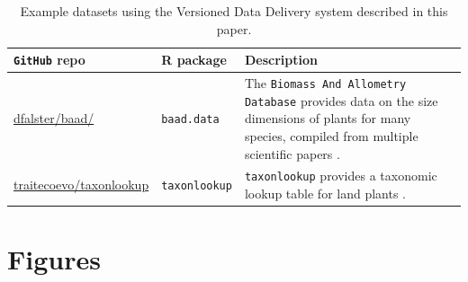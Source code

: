 \documentclass[a4paper,11pt]{article}
\newcommand{\ghsmurl}[1]{{\footnotesize\href{https://github.com/#1}{#1}}}
\begin{document}
\newpage

\begin{table}[h!]
\centering
\caption{Example datasets using the Versioned Data Delivery system described in this paper.}
{\footnotesize
\vspace{1cm}

  \begin{tabular}{p{3.5cm}p{3cm}p{7cm}}
  \hline
   \textbf{\texttt{GitHub} repo} & \textbf{R package} & \textbf{Description} \\ \hline
  \ghsmurl{dfalster/baad/} & \texttt{baad.data} & The \texttt{Biomass And Allometry Database} provides data on the size dimensions of plants for many species, compiled from multiple scientific papers \citep{Falster-2015}.\\
  \ghsmurl{traitecoevo/taxonlookup} & \texttt{taxonlookup} & \texttt{taxonlookup} provides a taxonomic lookup table for land plants \citep{Pennell-2015a}.\\
  \hline
  \end{tabular}
  }
\label{tab:examples}
\end{table}

\newpage
\section{Figures}
\end{document}
